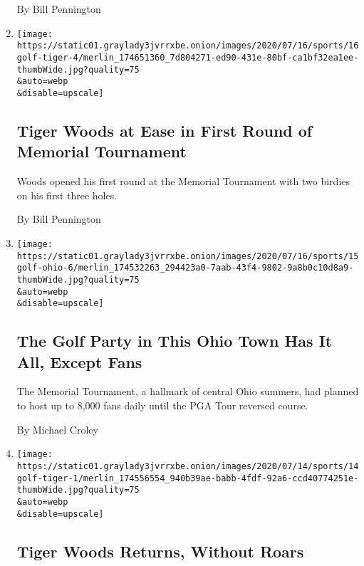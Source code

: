 \begin{enumerate}
  By Bill Pennington
\item
  \href{/2020/07/16/sports/golf/tiger-woods-memorial-tournament-pga.html}{}

  \texttt{[image: https://static01.graylady3jvrrxbe.onion/images/2020/07/16/sports/16golf-tiger-4/merlin\_174651360\_7d804271-ed90-431e-80bf-ca1bf32ea1ee-thumbWide.jpg?quality=75\\\&auto=webp\\\&disable=upscale]}

  \hypertarget{tiger-woods-at-ease-in-first-round-of-memorial-tournament}{%
  \subsection{Tiger Woods at Ease in First Round of Memorial
  Tournament}\label{tiger-woods-at-ease-in-first-round-of-memorial-tournament}}

  Woods opened his first round at the Memorial Tournament with two
  birdies on his first three holes.

  By Bill Pennington
\item
  \href{/2020/07/15/sports/golf/memorial-tournament-ohio-fans.html}{}

  \texttt{[image: https://static01.graylady3jvrrxbe.onion/images/2020/07/16/sports/15golf-ohio-6/merlin\_174532263\_294423a0-7aab-43f4-9802-9a8b0c10d8a9-thumbWide.jpg?quality=75\\\&auto=webp\\\&disable=upscale]}

  \hypertarget{the-golf-party-in-this-ohio-town-has-it-all-except-fans}{%
  \subsection{The Golf Party in This Ohio Town Has It All, Except
  Fans}\label{the-golf-party-in-this-ohio-town-has-it-all-except-fans}}

  The Memorial Tournament, a hallmark of central Ohio summers, had
  planned to host up to 8,000 fans daily until the PGA Tour reversed
  course.

  By Michael Croley
\item
  \href{/2020/07/14/sports/golf/tiger-woods-memorial-tournament.html}{}

  \texttt{[image: https://static01.graylady3jvrrxbe.onion/images/2020/07/14/sports/14golf-tiger-1/merlin\_174556554\_940b39ae-babb-4fdf-92a6-ccd40774251e-thumbWide.jpg?quality=75\\\&auto=webp\\\&disable=upscale]}

  \hypertarget{tiger-woods-returns-without-roars}{%
  \subsection{Tiger Woods Returns, Without
  Roars}\label{tiger-woods-returns-without-roars}}


\end{enumerate}
